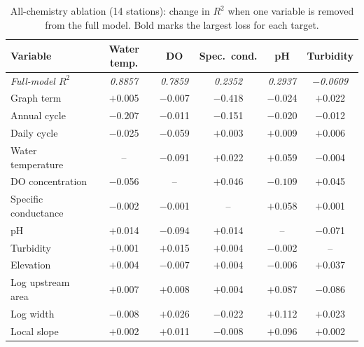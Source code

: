\documentclass[11pt]{article}
\begin{document}
\begin{table}[h]
\centering
\small
\caption{All-chemistry ablation (14 stations): change in $R^2$ when one variable is removed from the
full model. Bold marks the largest loss for each target.}
\label{tab:allchemabl}
\begin{tabular}{l c c c c c}
\toprule
Variable & {Water temp.} & {DO} & {Spec.\ cond.} & {pH} & {Turbidity} \\
\midrule
\emph{Full-model $R^2$} & \emph{0.8857} & \emph{0.7859} & \emph{0.2352} & \emph{0.2937} & \emph{$-$0.0609} \\
\midrule
Graph term             & $+$0.005 & $-$0.007 & $\mathbf{-0.418}$ & $-$0.024 & $+$0.022 \\
Annual cycle           & $\mathbf{-0.207}$ & $-$0.011 & $-$0.151 & $-$0.020 & $-$0.012 \\
Daily cycle            & $-$0.025 & $-$0.059 & $+$0.003 & $+$0.009 & $+$0.006 \\
Water temperature      & -- & $-$0.091 & $+$0.022 & $+$0.059 & $-$0.004 \\
DO concentration       & $-$0.056 & -- & $+$0.046 & $\mathbf{-0.109}$ & $+$0.045 \\
Specific conductance   & $-$0.002 & $-$0.001 & -- & $+$0.058 & $+$0.001 \\
pH                     & $+$0.014 & $\mathbf{-0.094}$ & $+$0.014 & -- & $-$0.071 \\
Turbidity              & $+$0.001 & $+$0.015 & $+$0.004 & $-$0.002 & -- \\
Elevation              & $+$0.004 & $-$0.007 & $+$0.004 & $-$0.006 & $+$0.037 \\
Log upstream area      & $+$0.007 & $+$0.008 & $+$0.004 & $+$0.087 & $\mathbf{-0.086}$ \\
Log width              & $-$0.008 & $+$0.026 & $-$0.022 & $+$0.112 & $+$0.023 \\
Local slope            & $+$0.002 & $+$0.011 & $-$0.008 & $+$0.096 & $+$0.002 \\
\bottomrule
\end{tabular}
\end{table}
\end{document}
